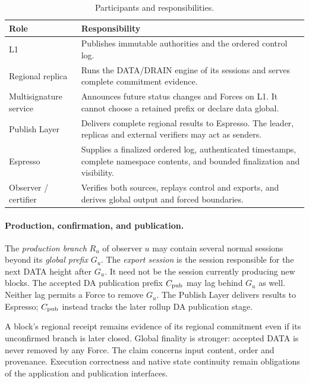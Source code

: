 \documentclass[11pt,a4paper]{article}
\newcommand{\defterm}[1]{\textcolor{rrBlue}{\textit{#1}}}
\begin{document}
\begin{table}[htbp]\centering\small
\caption{Participants and responsibilities.}\label{tab:roles}
\begin{tabularx}{\linewidth}{@{}>{\raggedright\arraybackslash}p{.19\linewidth}Y@{}}\toprule
Role & Responsibility\\\midrule
L1 & Publishes immutable authorities and the ordered control log.\\
Regional replica & Runs the DATA/DRAIN engine of its sessions and
serves complete commitment evidence.\\
Multisignature service & Announces future status changes and Forces
on L1. It cannot choose a retained prefix or declare data global.\\
Publish Layer & Delivers complete regional results to Espresso. The
leader, replicas and external verifiers may act as senders.\\
Espresso & Supplies a finalized ordered log, authenticated timestamps,
complete namespace contents, and bounded finalization and visibility.\\
Observer / certifier & Verifies both sources, replays control and
exports, and derives global output and forced boundaries.\\
\bottomrule
\end{tabularx}
\end{table}

\paragraph{Production, confirmation, and publication.}
The \defterm{production branch} $R_u$ of observer $u$ may contain
several normal sessions beyond its \defterm{global prefix} $G_u$.
The \defterm{export session} is the session responsible for the next
DATA height after $G_u$. It need not be the session currently producing
new blocks. The accepted DA publication prefix $C_{\rm pub}$ may lag
behind $G_u$ as well. Neither lag permits a Force to remove $G_u$.
The Publish Layer delivers results to Espresso; $C_{\rm pub}$ instead
tracks the later rollup DA publication stage.

A block's regional receipt remains evidence of its regional commitment
even if its unconfirmed branch is later closed. Global finality is
stronger: accepted DATA is never removed by any Force.
The claim concerns input content, order and provenance. Execution
correctness and native state continuity remain obligations of the
application and publication interfaces.
\end{document}
